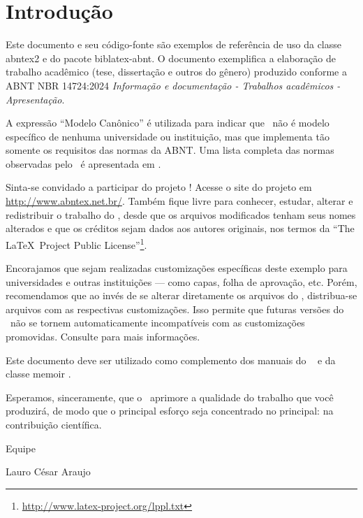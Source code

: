 \chapter{Introdução}

Este documento e seu código-fonte são exemplos de referência de uso da classe
\textsf{abntex2} e do pacote \textsf{biblatex-abnt}. O documento 
exemplifica a elaboração de trabalho acadêmico (tese, dissertação e outros do
gênero) produzido conforme a ABNT NBR 14724:2024 \emph{Informação e documentação
- Trabalhos acadêmicos - Apresentação}.

A expressão ``Modelo Canônico'' é utilizada para indicar que \abnTeX\ não é
modelo específico de nenhuma universidade ou instituição, mas que implementa tão
somente os requisitos das normas da ABNT. Uma lista completa das normas
observadas pelo \abnTeX\ é apresentada em .

Sinta-se convidado a participar do projeto \abnTeX! Acesse o site do projeto em
\url{http://www.abntex.net.br/}. Também fique livre para conhecer,
estudar, alterar e redistribuir o trabalho do \abnTeX, desde que os arquivos
modificados tenham seus nomes alterados e que os créditos sejam dados aos
autores originais, nos termos da ``The \LaTeX\ Project Public
License''\footnote{\url{http://www.latex-project.org/lppl.txt}}.

Encorajamos que sejam realizadas customizações específicas deste exemplo para
universidades e outras instituições --- como capas, folha de aprovação, etc.
Porém, recomendamos que ao invés de se alterar diretamente os arquivos do
\abnTeX, distribua-se arquivos com as respectivas customizações.
Isso permite que futuras versões do \abnTeX~não se tornem automaticamente
incompatíveis com as customizações promovidas. Consulte
 para mais informações.

Este documento deve ser utilizado como complemento dos manuais do \abnTeX\ 
\cite{abntex2classe,biblatex-abnt} e da classe \textsf{memoir}
\cite{memoir}. 

Esperamos, sinceramente, que o \abnTeX\ aprimore a qualidade do trabalho que
você produzirá, de modo que o principal esforço seja concentrado no principal:
na contribuição científica.

Equipe \abnTeX 

Lauro César Araujo
